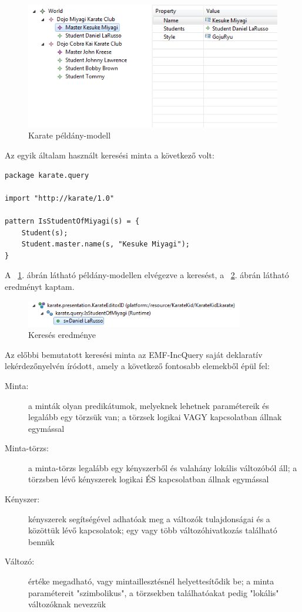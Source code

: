 \begin{figure}[h]
\centering
\includegraphics[width=\textwidth]{figures/karate-tree+properties.png}
\caption{Karate példány-modell}
\label{fig:karateModel}
\end{figure}
Az egyik általam használt keresési minta a következő volt:
\begin{lstlisting}
package karate.query

import "http://karate/1.0"

pattern IsStudentOfMiyagi(s) = {
    Student(s);
    Student.master.name(s, "Kesuke Miyagi");
}
\end{lstlisting}
A ~\ref{fig:karateModel}. ábrán látható példány-modellen elvégezve a keresést, a 
~\ref{fig:karateQuery}. ábrán látható eredményt kaptam.
\begin{figure}[h]
\centering
\includegraphics[width=0.85\textwidth]{figures/karate-query-result.png}
\caption{Keresés eredménye}
\label{fig:karateQuery}
\end{figure}

Az előbbi bemutatott keresési minta az EMF-IncQuery saját deklaratív lekérdezőnyelvén íródott, 
amely a következő fontosabb elemekből épül fel:
\begin{description}
\item[Minta:] a minták olyan predikátumok, melyeknek lehetnek paramétereik és legalább egy törzsük 
van; a törzsek logikai VAGY kapcsolatban állnak egymással
\item[Minta-törzs:] a minta-törzs legalább egy kényszerből és valahány lokális változóból áll; a 
törzsben lévő kényszerek logikai ÉS kapcsolatban állnak egymással 
\item[Kényszer:] kényszerek segítségével adhatóak meg a változók tulajdonságai és a közöttük lévő 
kapcsolatok; egy vagy több változóhivatkozás található bennük
\item[Változó:] értéke megadható, vagy mintaillesztésnél helyettesítődik be; a minta paramétereit 
"szimbolikus", a törzsekben találhatóakat pedig "lokális" változóknak nevezzük
\end{description}

